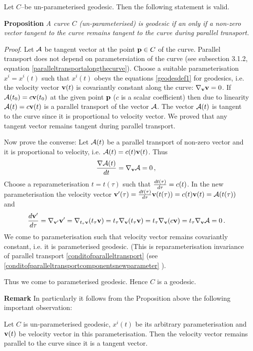 \documentclass[12pt]{article}
\theoremstyle{theorem}
\numberwithin{equation}{section}
\begin{document}
{\m


   Let $C$--be un-parameterised geodesic.
   Then the following statement is valid.

\m

   {\bf Proposition} {\it A curve $C$ (un-parameterised) is geodesic
   if an only if a non-zero vector tangent to the curve 
remains tangent to the curve
   during parallel transport.}



   \m
   {\sl Proof}.  Let ${\cal A}$ be tangent vector at the point ${\bf p}\in C$ of the curve.
  Parallel transport does not depend on parametersiation of the curve
  (see subsection 3.1.2, equation \eqref{paralleltransportalongthecurve}).  
Choose a suitable parameterisation $x^i=x^i(t)$  such that
 $x^i(t)$ obeys the equations \eqref{geodesdef1} for geodesics,
 i.e. the velocity vector ${\bf v}(t)$ is covariantly constant along the curve:
 $\nabla_{\bf v}{\bf v}=0$. If ${\cal A}(t_0)=c{\bf v}(t_0)$
 at the given point ${\bf p}$ ($c$ is a scalar coefficient) then due to linearity ${\cal A}(t)=c{\bf v}(t)$ is a parallel
 transport of the vector ${\cal A}$. The vector ${\cal A}(t)$ is tangent to the curve since it is proportional to velocity vector.
  We proved that any tangent vector remains tangent during parallel transport.

Now prove the converse: Let ${\cal A}(t)$ be a parallel 
transport of non-zero vector and it 
is proportional to velocity, i.e.
    ${\cal A}(t)=c(t){\bf v}(t)$. Thus
      $$
{\nabla {\cal A}(t)\over dt}=\nabla_{{\bf v}}{\cal A}=0\,,\,
      $$
  Choose a reparameterisation $t=t(\tau)$ such that
  ${dt(\tau)\over d\tau}=c(t)$. 
In the new parameterisation the velocity vector
  ${\bf v}'(\tau)={dt(\tau)\over d\tau}{\bf v}(t(\tau))=
  c(t){\bf v}(t)={\cal A}(t(\tau))$ and
     $$
{d {\bf v}'\over d\tau}=\nabla_{{\bf v}'}{\bf v}'=
\nabla_{t_\tau{\bf v}}(t_\tau{\bf v})=
t_\tau\nabla_{{\bf v}}(t_\tau{\bf v})=
t_\tau\nabla_{{\bf v}}(c {\bf v})=
t_\tau\nabla_{\bf v}{\cal A}=0\,.
     $$
We come to parameterisation such that 
velocity vector remains covariantly constant,
i.e. it is parameterised geodesic.
(This is 
reparameterisation invariance of parallel transport
\eqref{conditofparalleltransport}
(see \eqref{conditofparalleltransportcomponentsnewparameter}
).  
}
  Thus we come to parameterised geodesic.
  Hence $C$ is a geodesic.

\m

{\bf Remark} In particularly it follows from the Proposition above the following important observation:

Let  $C$ is un-parameterised geodesic, $x^i(t)$ be its  arbitrary parameterisation
and ${\bf v}(t)$ be velocity vector in this parameterisation. Then the velocity vector remains parallel to the curve
since it is a tangent vector.
\end{document}
